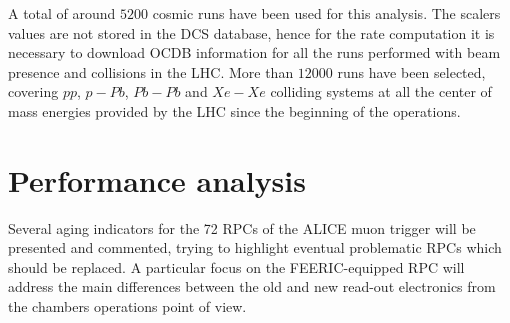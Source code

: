 A total of around $5200$ cosmic runs have been used for this analysis.
The scalers values are not stored in the DCS database, hence for the rate computation it is necessary to download OCDB information for all the runs performed with beam presence and collisions in the LHC.
More than $12000$ runs have been selected, covering $pp$, $p-Pb$, $Pb-Pb$ and $Xe-Xe$ colliding systems at all the center of mass energies provided by the LHC since the beginning of the operations.



\section{Performance analysis}
Several aging indicators for the 72 RPCs of the ALICE muon trigger will be presented and commented, trying to highlight eventual problematic RPCs which should be replaced.
A particular focus on the FEERIC-equipped RPC will address the main differences between the old and new read-out electronics from the chambers operations point of view.

